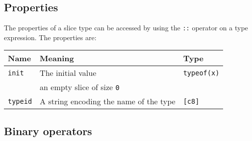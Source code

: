 \subsection{Properties}

The properties of a slice type can be accessed by using the \texttt{::} operator on a type expression. The properties are:

\begin{center}\begin{adjustbox}{max width=\linewidth}
  \begin{tabular}{|l|ll|}
    \hline
    Name & Meaning & Type\\
    \hline
    \hline
    \texttt{init} & The initial value & \texttt{typeof(x)}\\
    & an empty slice of size \texttt{0} & \\
    \hline
    \texttt{typeid} & A string encoding the name of the type & \texttt{[c8]} \\
    \hline
  \end{tabular}
\end{adjustbox}\end{center}

\subsection{Binary operators}


